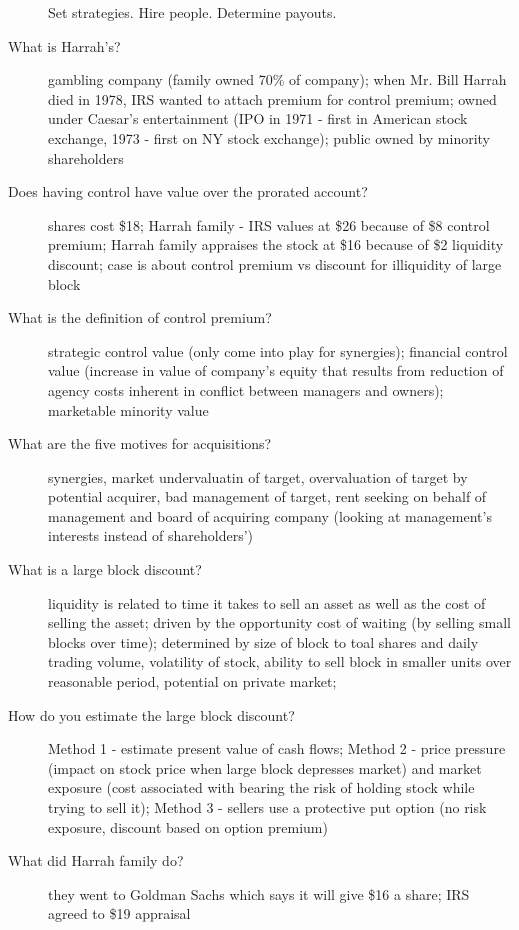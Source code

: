 \documentclass[11pt]{article}
\begin{document}
\begin{description}
  Set strategies.
  Hire people.
  Determine payouts.
\item[What is Harrah's?]
  gambling company (family owned 70\% of company);
  when Mr. Bill Harrah died in 1978, IRS wanted to attach premium for control premium;
  owned under Caesar's entertainment (IPO in 1971 - first in American stock exchange, 1973 - first on NY stock exchange);
  public owned by minority shareholders
\item[Does having control have value over the prorated account?]
  shares cost \$18;
  Harrah family - IRS values at \$26 because of \$8 control premium;
  Harrah family appraises the stock at \$16 because of \$2 liquidity discount;
  case is about control premium vs discount for illiquidity of large block
\item[What is the definition of control premium?]
  strategic control value (only come into play for synergies);
  financial control value (increase in value of company's equity that results from reduction of agency  costs inherent in conflict between managers and owners);
  marketable minority value
\item[What are the five motives for acquisitions?]
  synergies, market undervaluatin of target, overvaluation of target by potential acquirer,
  bad management of target, rent seeking on behalf of management and board of acquiring company (looking at management's interests instead of shareholders')
\item[What is a large block discount?]
  liquidity is related to time it takes to sell an asset as well as the cost of selling the asset;
  driven by the opportunity cost of waiting (by selling small blocks over time);
  determined by size of block to toal shares and daily trading volume, volatility of stock, ability to sell block in smaller units over reasonable period, potential on private market;
\item[How do you estimate the large block discount?]
  Method 1 - estimate present value of cash flows;
  Method 2 - price pressure (impact on stock price when large block depresses market) and market exposure (cost associated with bearing the risk of holding stock while trying to sell it);
  Method 3 - sellers use a protective put option (no risk exposure, discount based on option premium)
\item[What did Harrah family do?]
  they went to Goldman Sachs which says it will give \$16 a share;
  IRS agreed to \$19 appraisal
\end{description}
\end{document}
